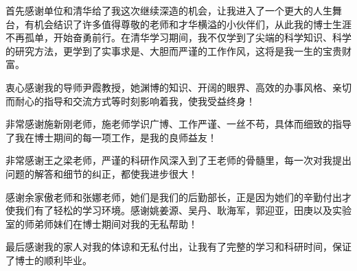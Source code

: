 
\begin{ack}
首先感谢单位和清华给了我这次继续深造的机会，让我进入了一个更大的人生舞台，有机会结识了许多值得尊敬的老师和才华横溢的小伙伴们，从此我的博士生涯不再孤单，开始奋勇前行。在清华学习期间，我不仅学到了尖端的科学知识、科学的研究方法，更学到了实事求是、大胆而严谨的工作作风，这将是我一生的宝贵财富。\par

衷心感谢我的导师尹霞教授，她渊博的知识、开阔的眼界、高效的办事风格、亲切而耐心的指导和交流方式等时刻影响着我，使我受益终身！\par

非常感谢施新刚老师，施老师学识广博、工作严谨、一丝不苟，具体而细致的指导了我在博士期间的每一项工作，是我的良师益友！\par

非常感谢王之梁老师，严谨的科研作风深入到了王老师的骨髓里，每一次对我提出问题的解答和细节的纠正，都使我进步很大！\par

感谢余家傲老师和张娜老师，她们是我们的后勤部长，正是因为她们的辛勤付出才使我们有了轻松的学习环境。感谢姚姜源、吴丹、耿海军，郭迎亚，田庚以及实验室的师弟师妹们在博士期间对我的无私帮助！\par

最后感谢我的家人对我的体谅和无私付出，让我有了完整的学习和科研时间，保证了博士的顺利毕业。


\end{ack}
